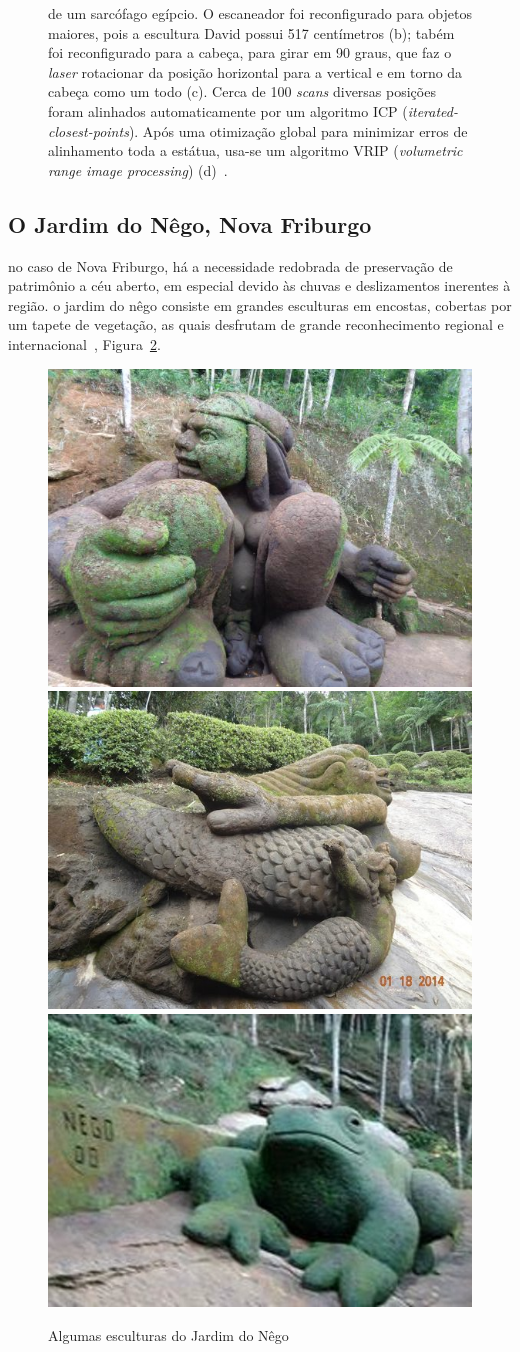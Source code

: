 \begin{figure}[!h]
{   de um sarcófago egípcio. O escaneador foi reconfigurado para objetos maiores, pois 
   a escultura David possui 517 centímetros (b); tabém foi reconfigurado para a cabeça,  
   para girar em 90 graus, que faz o \emph{laser}
   rotacionar da posição horizontal para a vertical e em torno da
   cabeça como um todo (c). Cerca de 100 \emph{scans}
   diversas posições foram alinhados automaticamente por um algoritmo 
   ICP (\emph{iterated-closest-points}). Após uma otimização global para minimizar erros 
   de alinhamento toda a estátua, usa-se um algoritmo VRIP (\emph {volumetric
   range image processing}) (d)~\cite{levoy2000digital}}.
  \label{fig:david}
\end{figure}

\subsection*{O Jardim do Nêgo, Nova Friburgo}
no caso de Nova Friburgo, há a necessidade redobrada de preservação de
patrimônio a céu aberto, em especial devido às chuvas e deslizamentos inerentes à região.  o
jardim do nêgo consiste em grandes esculturas em encostas, cobertas por um tapete de
vegetação, as quais desfrutam de grande reconhecimento regional e internacional~\cite{jardimdonego:theguardian},
Figura~\ref{fig:esculturas}.

\begin{figure} [!h]
	\centering
	\includegraphics[height=0.23\linewidth]{figs/jardim-do-nego.jpg}
	\includegraphics[height=0.23\linewidth]{figs/jardim-do-nego22.jpg}
	\includegraphics[height=0.23\linewidth]{figs/jardim-do-nego32-small.jpg}
	\caption{Algumas esculturas do Jardim do Nêgo~\cite{JardimDoNego:TheGuardian}}\label{fig:esculturas}
\end{figure}


